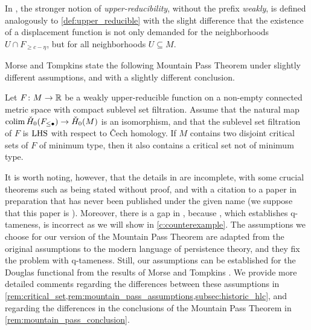 In \cite[p.~36]{Morse.1938}, the stronger notion of \emph{upper-reducibility}, without the prefix \emph{weakly}, is defined analogously to \cref{def:upper_reducible} with the slight difference that the existence of a displacement function is not only demanded for the neighborhoods $U \cap F_{\geq c - \eta}$, but for all neighborhoods $U \subseteq M$.

Morse and Tompkins state the following Mountain Pass Theorem under slightly different assumptions, and with a slightly different conclusion.


\begin{thm}
\label{thm:mountain_pass}
	Let $F \colon M \to \mathbb{R}$ be a weakly upper-reducible function on a non-empty connected metric space with compact sublevel set filtration.
	Assume that the natural map $\operatorname*{colim} \check{H}_0(F_{\leq \bullet}) \to \check{H}_0(M)$ is an isomorphism, and that the sublevel set filtration of $F$ is $\mathrm{LHS}$ with respect to \v Cech homology.
	If $M$ contains two disjoint critical sets of $F$ of minimum type, then it also contains a critical set not of minimum type.
\end{thm}

It is worth noting, however, that the details in \cite{Morse.1939} are incomplete, with some crucial theorems such as \cite[Theorems 7.3 and 7.4, Corollary 7.1]{Morse.1939} being stated without proof, and with a citation to a paper in preparation that has never been published under the given name (we suppose that this paper is \cite{Morse.1940}).
Moreover, there is a gap in \cite{Morse.1940}, because \cite[Theorem 6.3]{Morse.1940}, which establishes q-tameness, is incorrect as we will show in \cref{c:counterexample}.
The assumptions we choose for our version of the Mountain Pass Theorem are adapted from the original assumptions to the modern language of persistence theory, and they fix the problem with q-tameness.
Still, our assumptions can be established for the Douglas functional from the results of Morse and Tompkins \cite{Morse.1939}.
We provide more detailed comments regarding the differences between these assumptions in \cref{rem:critical_set,rem:mountain_pass_assumptions,subsec:historic_hlc}, and regarding the differences in the conclusions of the Mountain Pass Theorem in \cref{rem:mountain_pass_conclusion}.

